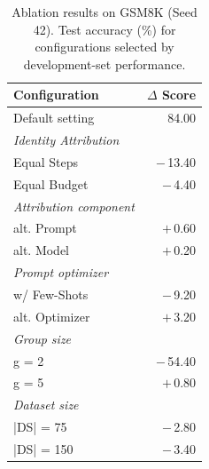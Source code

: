 \begin{table}
  \centering
  \caption{Ablation results on GSM8K (Seed 42). Test accuracy (\%) for configurations selected by development-set performance.}
  \label{tab:ablations}
  \renewcommand{\arraystretch}{1}
  \begin{tabular}{lr}
    \toprule
    \textbf{Configuration} & \textbf{$\Delta$ Score} \\
    \midrule
    Default setting & 84.00 \\
    \midrule
    \textit{Identity Attribution} &  \\
    \hspace{1em}Equal Steps & $-$\,13.40 \\
    \hspace{1em}Equal Budget & $-$\,\phantom{0}4.40 \\
    \midrule
    \textit{Attribution component} &  \\
    \hspace{1em}alt. Prompt & $+$\,\phantom{0}0.60 \\
    \hspace{1em}alt. Model & $+$\,\phantom{0}0.20 \\
    \midrule
    \textit{Prompt optimizer} &  \\
    \hspace{1em}w/ Few-Shots & $-$\,\phantom{0}9.20 \\
    \hspace{1em}alt. Optimizer & $+$\,\phantom{0}3.20 \\
    \midrule
    \textit{Group size} &  \\
    \hspace{1em}g = 2 & $-$\,54.40 \\
    \hspace{1em}g = 5 & $+$\,\phantom{0}0.80 \\
    \midrule
    \textit{Dataset size} &  \\
    \hspace{1em}|DS| = \phantom{0}75 & $-$\,\phantom{0}2.80 \\
    \hspace{1em}|DS| = 150 & $-$\,\phantom{0}3.40 \\
    \bottomrule
  \end{tabular}
\end{table}
